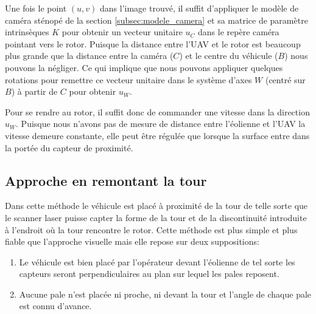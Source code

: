 Une fois le point $(u,v)$ dans l'image trouvé, il suffit d'appliquer le modèle de caméra sténopé de la section \ref{subsec:modele_camera} et sa matrice de paramètre intrinsèques $K$ pour obtenir un vecteur unitaire $u_C$ dans le repère caméra pointant vers le rotor. Puisque la distance entre l'UAV et le rotor est beaucoup plus grande que la distance entre la caméra ($C$) et le centre du véhicule ($B$) nous pouvons la négliger. Ce qui implique que nous pouvons appliquer quelques rotations pour remettre ce vecteur unitaire dans le système d'axes $W$ (centré sur $B$) à partir de $C$ pour obtenir $u_W$.

Pour se rendre au rotor, il suffit donc de commander une vitesse dans la direction $u_W$. Puisque nous n'avons pas de mesure de distance entre l'éolienne et l'UAV la vitesse demeure constante, elle peut être régulée que lorsque la surface entre dans la portée du capteur de proximité.

\subsection{Approche en remontant la tour}
\label{subsec:laser_tower}

Dans cette méthode le véhicule est placé à proximité de la tour de telle sorte que le scanner laser puisse capter la forme de la tour et de la discontinuité introduite à l'endroit où la tour rencontre le rotor. Cette méthode est plus simple et plus fiable que l'approche visuelle mais elle repose sur deux suppositions:
\begin{enumerate}
  \item Le véhicule est bien placé par l'opérateur devant l'éolienne de tel sorte les capteurs seront perpendiculaires au plan sur lequel les pales reposent.
  \item Aucune pale n'est placée ni proche, ni devant la tour et l'angle de chaque pale est connu d'avance.
\end{enumerate}

